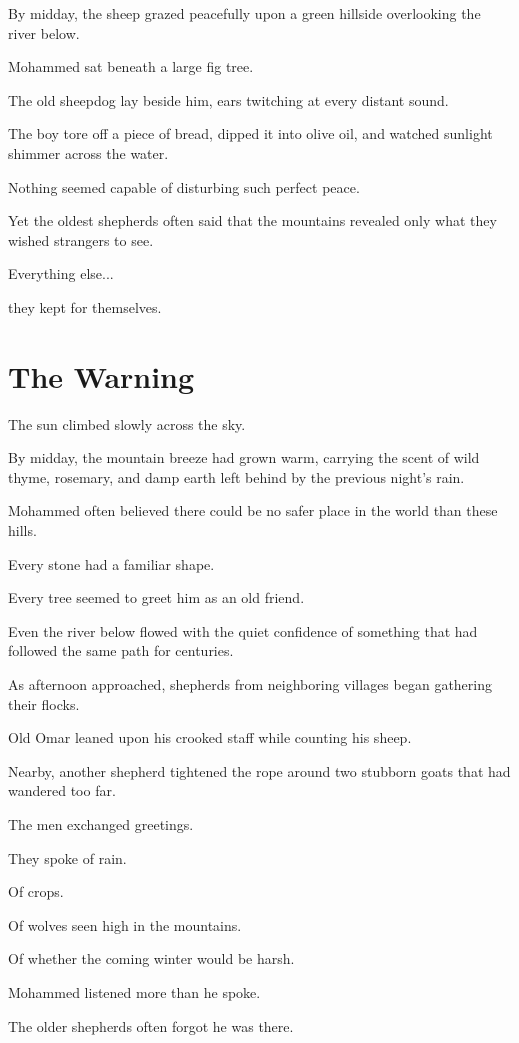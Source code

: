\documentclass[12pt,openany]{book}
\begin{document}
By midday, the sheep grazed peacefully upon a green hillside overlooking the river below.

Mohammed sat beneath a large fig tree.

The old sheepdog lay beside him, ears twitching at every distant sound.

The boy tore off a piece of bread, dipped it into olive oil, and watched sunlight shimmer across the water.

Nothing seemed capable of disturbing such perfect peace.

Yet the oldest shepherds often said that the mountains revealed only what they wished strangers to see.

Everything else...

they kept for themselves.
\section*{The Warning}

The sun climbed slowly across the sky.

By midday, the mountain breeze had grown warm, carrying the scent of wild thyme, rosemary, and damp earth left behind by the previous night's rain.

Mohammed often believed there could be no safer place in the world than these hills.

Every stone had a familiar shape.

Every tree seemed to greet him as an old friend.

Even the river below flowed with the quiet confidence of something that had followed the same path for centuries.

As afternoon approached, shepherds from neighboring villages began gathering their flocks.

Old Omar leaned upon his crooked staff while counting his sheep.

Nearby, another shepherd tightened the rope around two stubborn goats that had wandered too far.

The men exchanged greetings.

They spoke of rain.

Of crops.

Of wolves seen high in the mountains.

Of whether the coming winter would be harsh.

Mohammed listened more than he spoke.

The older shepherds often forgot he was there.
\end{document}
